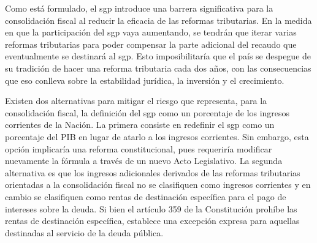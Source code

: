 Como está formulado, el \gls{sgp} introduce una barrera significativa para la consolidación fiscal al reducir la eficacia de las reformas tributarias. En la medida en que la participación del \gls{sgp} vaya aumentando, se tendrán que iterar varias reformas tributarias para poder compensar la parte adicional del recaudo que eventualmente se destinará al \gls{sgp}. Esto imposibilitaría que el país se despegue de su tradición de hacer una reforma tributaria cada dos años, con las consecuencias que eso conlleva sobre la estabilidad jurídica, la inversión y el crecimiento.  

Existen dos alternativas para mitigar el riesgo que representa, para la consolidación fiscal, la definición del \gls{sgp} como un porcentaje de los ingresos corrientes de la Nación. La primera consiste en redefinir el \gls{sgp} como un porcentaje del PIB en lugar de atarlo a los ingresos corrientes. Sin embargo, esta opción implicaría una reforma constitucional, pues requeriría modificar nuevamente la fórmula a través de un nuevo Acto Legislativo. La segunda alternativa es que los ingresos adicionales derivados de las reformas tributarias orientadas a la consolidación fiscal no se clasifiquen como ingresos corrientes y en cambio se clasifiquen como rentas de destinación específica para el pago de intereses sobre la deuda. Si bien el artículo 359 de la Constitución prohíbe las rentas de destinación específica, establece una excepción expresa para aquellas destinadas al servicio de la deuda pública.



